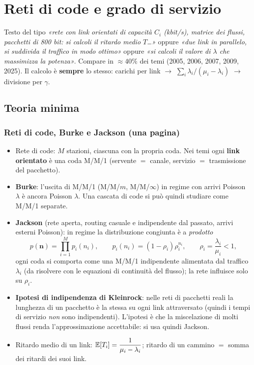 \chapter{Reti di code e grado di servizio}\label{cap:reti}

\begin{nota}
Testo del tipo \emph{«rete con link orientati di capacità $C_i$ (kbit/s), matrice dei flussi, pacchetti di 800 bit: si calcoli il ritardo medio $T$\dots»} oppure \emph{«due link in parallelo, si suddivida il traffico in modo ottimo»} oppure \emph{«si calcoli il valore di $\lambda$ che massimizza la potenza»}. Compare in $\approx 40\%$ dei temi (2005, 2006, 2007, 2009, 2025). Il calcolo è \textbf{sempre} lo stesso: carichi per link $\to$ $\sum_i \lambda_i/(\mu_i-\lambda_i)$ $\to$ divisione per $\gamma$.
\end{nota}

\section{Teoria minima}

\subsection{Reti di code, Burke e Jackson (una pagina)}
\begin{itemize}
\item Rete di code: $M$ stazioni, ciascuna con la propria coda. Nei temi ogni \textbf{link orientato} è una coda M/M/1 (servente $=$ canale, servizio $=$ trasmissione del pacchetto).
\item \textbf{Burke}: l'uscita di M/M/1 (M/M/$m$, M/M/$\infty$) in regime con arrivi Poisson $\lambda$ è ancora Poisson $\lambda$. Una cascata di code si può quindi studiare come M/M/1 separate.
\item \textbf{Jackson} (rete aperta, routing casuale e indipendente dal passato, arrivi esterni Poisson): in regime la distribuzione congiunta è a \emph{prodotto}
\[
p(\mathbf n)=\prod_{i=1}^Mp_i(n_i),\qquad p_i(n_i)=(1-\rho_i)\rho_i^{n_i},\qquad \rho_i=\frac{\lambda_i}{\mu_i}<1 ,
\]
ogni coda si comporta come una M/M/1 indipendente alimentata dal traffico $\lambda_i$ (da risolvere con le equazioni di continuità del flusso); la rete influisce solo su $\rho_i$.
\item \textbf{Ipotesi di indipendenza di Kleinrock}: nelle reti di pacchetti reali la lunghezza di un pacchetto è la stessa su ogni link attraversato (quindi i tempi di servizio \emph{non} sono indipendenti). L'ipotesi è che la miscelazione di molti flussi renda l'approssimazione accettabile: si usa quindi Jackson.
\item Ritardo medio di un link: $\mathbb{E}[T_i]=\dfrac{1}{\mu_i-\lambda_i}$; ritardo di un cammino $=$ somma dei ritardi dei suoi link.
\end{itemize}


